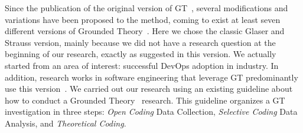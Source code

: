 Since the publication of the original version of GT~\cite{glase1967discovery},
several modifications and variations have been proposed to the method, coming to
exist at least seven different versions of Grounded Theory~\cite{denzin2007grounded}.
Here we chose the classic
Glaser and Strauss version, mainly because we did not have a research
question at the beginning of our research, exactly as suggested in this
version. We actually started from an area of interest: successful DevOps adoption
in industry. In addition, research works in software engineering that leverage GT
predominantly use this version~\cite{stol2016grounded}.
We carried out our research using an existing
guideline about how to conduct a
Grounded Theory~\cite{adolph2011using} research. This guideline organizes
a GT investigation in three steps: \emph{Open Coding} Data Collection,
\emph{Selective Coding} Data Analysis, and \emph{Theoretical Coding}.







